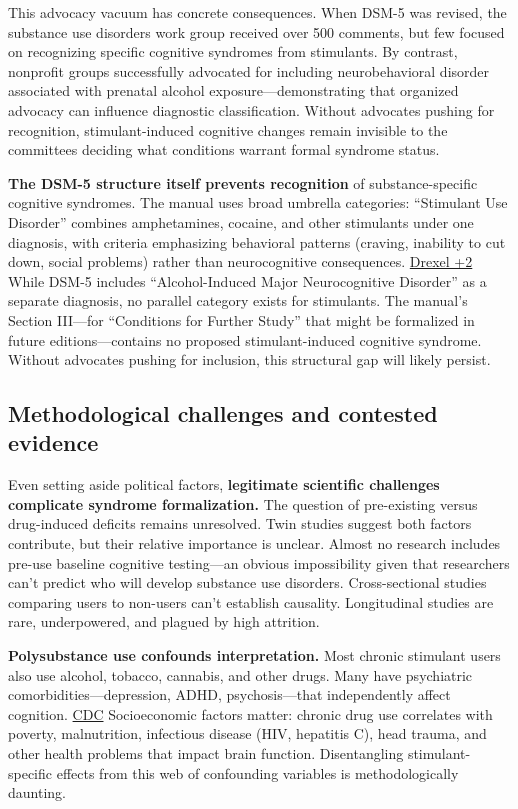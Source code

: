 This advocacy vacuum has concrete consequences. When DSM-5 was revised, the substance use disorders work group received over 500 comments, but few focused on recognizing specific cognitive syndromes from stimulants. By contrast, nonprofit groups successfully advocated for including neurobehavioral disorder associated with prenatal alcohol exposure---demonstrating that organized advocacy can influence diagnostic classification. Without advocates pushing for recognition, stimulant-induced cognitive changes remain invisible to the committees deciding what conditions warrant formal syndrome status.

\textbf{The DSM-5 structure itself prevents recognition} of substance-specific cognitive syndromes. The manual uses broad umbrella categories: ``Stimulant Use Disorder'' combines amphetamines, cocaine, and other stimulants under one diagnosis, with criteria emphasizing behavioral patterns (craving, inability to cut down, social problems) rather than neurocognitive consequences. \href{https://webcampus.med.drexel.edu/nida/module_2/content/5_0_AbuseOrDependence.htm}{Drexel +2} While DSM-5 includes ``Alcohol-Induced Major Neurocognitive Disorder'' as a separate diagnosis, no parallel category exists for stimulants. The manual's Section III---for ``Conditions for Further Study'' that might be formalized in future editions---contains no proposed stimulant-induced cognitive syndrome. Without advocates pushing for inclusion, this structural gap will likely persist.

\subsection{Methodological challenges and contested evidence}\label{16_missing_syndrome-methodological-challenges-and-contested-evidence}

Even setting aside political factors, \textbf{legitimate scientific challenges complicate syndrome formalization.} The question of pre-existing versus drug-induced deficits remains unresolved. Twin studies suggest both factors contribute, but their relative importance is unclear. Almost no research includes pre-use baseline cognitive testing---an obvious impossibility given that researchers can't predict who will develop substance use disorders. Cross-sectional studies comparing users to non-users can't establish causality. Longitudinal studies are rare, underpowered, and plagued by high attrition.

\textbf{Polysubstance use confounds interpretation.} Most chronic stimulant users also use alcohol, tobacco, cannabis, and other drugs. Many have psychiatric comorbidities---depression, ADHD, psychosis---that independently affect cognition. \href{https://www.cdc.gov/mmwr/volumes/69/wr/mm6912a1.htm}{CDC} Socioeconomic factors matter: chronic drug use correlates with poverty, malnutrition, infectious disease (HIV, hepatitis C), head trauma, and other health problems that impact brain function. Disentangling stimulant-specific effects from this web of confounding variables is methodologically daunting.

